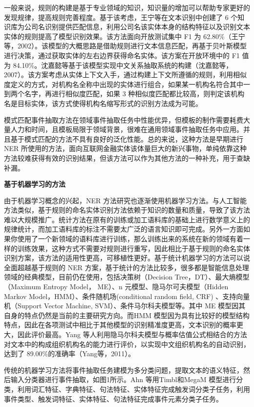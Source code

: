 \documentclass[letterpaper]{article}
\begin{document}
    一般来说，规则的构建是基于专业领域的知识，知识量的增加可以帮助专家更好的发现规律，提高规则完善程度。基于该考虑，王宁等在文本识别中创建了 6 个知识库为公司名识别提供匹配信息，利用公司名该实体本身的结构特征以及识别文本实体的规则提高了模型识别效果。该方法面向开放测试集中 F1 为  62.80\%（王宁等，2002）。\cite{2}该模型的大概思路是借助规则进行文本信息匹配，再基于贝叶斯模型进行决策，通过获取实体的左右边界获得命名实体。该方案在开放环境中的 F1 值为 84.10\%。沈嘉懿等基于该模型实现中文关系抽取系统的构建（沈嘉懿等，2007）。该方案考虑从实体上下文入手，通过构建上下文所遵循的规则，利用相似度定义的方式，对机构名全称中出现的实体进行组合，如果某一机构名符合其中一到两个名字，再进行相似度匹配，如果 3 种相似度匹配都比较高，则判定该机构名是目标实体，该方式使得机构名缩写形式的识别方法成为可能。
    
    模式匹配事件抽取方法在领域事件抽取任务中性能优异，但模板的制作需要耗费大量人力和时间，且模板局限于领域背景，很难在通用领域事件抽取任务中应用。并且基于模式匹配的方法不具有良好的泛化性能。总的来说，这种方法是早期进行 NER 所使用的方法，面向互联网金融实体该体量巨大的新兴事物，单纯依靠这种方法较难获得有效的识别结果，但该方法可以作为其他方法的一种补充，用于查缺补漏。
    
    \textbf{基于机器学习的方法}
    
    由于机器学习概念的兴起，NER 方法研究也逐渐使用机器学习方法。与人工智能方法类似，基于规则的命名实体识别方法依赖于知识的数量和质量，导致了该方法难以大规模推广。统计方法在原有的训练或加工语料库的基础上进行数学意义上的规律统计，而加工语料库的标注不需要太广泛的语言知识即可完成。另外一方面如果你使用了一个新领域的语料库进行训练，那么训练出来的系统在新的领域有着一样的训练效果，这种方式不需要对规则进行重写，因此相比于基于规则的命名实体识别方案，该方法的适用性更高，可移植性更好。基于统计机器学习的方法可以说全面超越基于规则的 NER 方案，基于统计的方法比较多，很多都是智能信息处理领域的经典模型，目前仍在使用，包括决策树（Decision Tree，DT）、最大熵模型（Maximum Entropy Model，  ME）、n 元模型、隐马尔可夫模型（Hidden Markov Model，HMM）、条件随机场(conditional random field, CRF) 、支持向量机（Support Vector Machine, SVM）、条件马尔科夫模型等。其中 ME 模型因其自身的特点仍然是当前的主要研究方向。而HMM 模型因为具有比较好的模型结构特点，因此在各项测试中相比于其他模型的识别精准度更高，文本识别的概率更大，因此评价最高。Yang 等人利用隐马尔科夫模型与概率估值公式相结合的方法对文本中的构成组织机构名的能力进行评价，以实现中文组织机构名的自动识别，达到了 89.00\%的准确率（Yang等，2011）。
    
    传统的机器学习方法将事件抽取任务建模为多分类问题，提取文本的语义特征，然后输入分类器进行事件抽取，如图1所示。Ahn 等\cite{3}用Timbl和MegaM 模型进行分类，利用词汇特征、字典特征、句法特征、实体特征完成触发词分类子任务，利用事件类型、触发词特征、实体特征、句法特征完成事件元素分类子任务。
    
\end{document}
